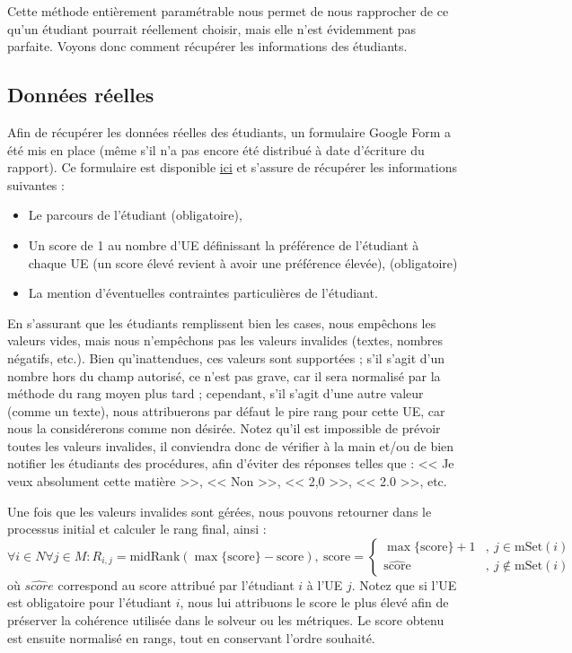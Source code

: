 \documentclass{rapport}
\theoremstyle{definition}
\theoremstyle{remark}
\theoremstyle{plain}
\theoremstyle{definition}
\theoremstyle{definition}
\theoremstyle{remark}
\theoremstyle{definition}
\begin{document}
Cette méthode entièrement paramétrable nous permet de nous rapprocher de ce qu'un étudiant pourrait réellement choisir, mais elle n'est évidemment pas parfaite.
Voyons donc comment récupérer les informations des étudiants.

\subsection{Données réelles}
Afin de récupérer les données réelles des étudiants, un formulaire Google Form a été mis en place (même s'il n'a pas encore été distribué à date d'écriture du rapport).
Ce formulaire est disponible \href{https://docs.google.com/forms/d/1fwVHNHbTxya-Qh55OrPIojUvQd-1lwp7hdd4YcqTsh4/}{ici} et s'assure de récupérer les informations suivantes :
\begin{itemize}
    \item Le parcours de l'étudiant (obligatoire),
    \item Un score de 1 au nombre d'UE définissant la préférence de l'étudiant à chaque UE (un score élevé revient à avoir une préférence élevée), (obligatoire)
    \item La mention d'éventuelles contraintes particulières de l'étudiant.
\end{itemize}

En s'assurant que les étudiants remplissent bien les cases, nous empêchons les valeurs vides, mais nous n'empêchons pas les valeurs invalides (textes, nombres négatifs, etc.).
Bien qu'inattendues, ces valeurs sont supportées ; s'il s'agit d'un nombre hors du champ autorisé, ce n'est pas grave, car il sera normalisé par la méthode du rang moyen plus tard ; cependant, s'il s'agit d'une autre valeur (comme un texte), nous attribuerons par défaut le pire rang pour cette UE, car nous la considérerons comme non désirée.
Notez qu'il est impossible de prévoir toutes les valeurs invalides, il conviendra donc de vérifier à la main et/ou de bien notifier les étudiants des procédures, afin d'éviter des réponses telles que : << Je veux absolument cette matière >>, << Non >>, << 2,0 >>, << 2.0 >>, etc.

Une fois que les valeurs invalides sont gérées, nous pouvons retourner dans le processus initial et calculer le rang final, ainsi :
$$
    \forall i \in N\forall j\in M : R_{i,j} = \text{midRank}(\max\{\text{score}\}-\text{score}),\ \text{score}=\begin{cases}
        \max\{\text{score}\}+1 &,\ j\in\text{mSet}(i)\\
        \widehat{\text{score}} &,\ j\not\in\text{mSet}(i)
    \end{cases}
$$
où $\widehat{score}$ correspond au score attribué par l'étudiant $i$ à l'UE $j$. Notez que si l'UE est obligatoire pour l'étudiant $i$, nous lui attribuons le score le plus élevé afin de préserver la cohérence utilisée dans le solveur ou les métriques.
Le score obtenu est ensuite normalisé en rangs, tout en conservant l'ordre souhaité.
\end{document}
